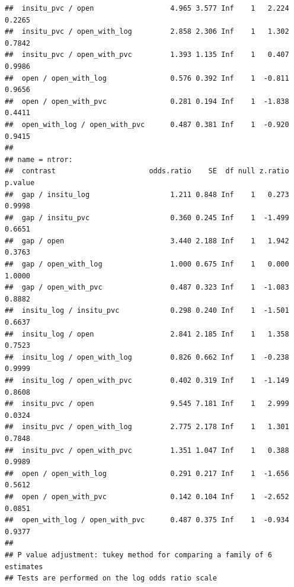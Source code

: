 \documentclass[
]{article}
\newenvironment{Shaded}{\begin{snugshade}}{\end{snugshade}}
\newcommand{\AttributeTok}[1]{\textcolor[rgb]{0.13,0.29,0.53}{#1}}
\newcommand{\ConstantTok}[1]{\textcolor[rgb]{0.56,0.35,0.01}{#1}}
\newcommand{\DecValTok}[1]{\textcolor[rgb]{0.00,0.00,0.81}{#1}}
\newcommand{\DocumentationTok}[1]{\textcolor[rgb]{0.56,0.35,0.01}{\textbf{\textit{#1}}}}
\newcommand{\FunctionTok}[1]{\textcolor[rgb]{0.13,0.29,0.53}{\textbf{#1}}}
\newcommand{\NormalTok}[1]{#1}
\newcommand{\OtherTok}[1]{\textcolor[rgb]{0.56,0.35,0.01}{#1}}
\newcommand{\SpecialCharTok}[1]{\textcolor[rgb]{0.81,0.36,0.00}{\textbf{#1}}}
\newcommand{\StringTok}[1]{\textcolor[rgb]{0.31,0.60,0.02}{#1}}
\begin{document}
\begin{verbatim}
##  insitu_pvc / open                  4.965 3.577 Inf    1   2.224  0.2265
##  insitu_pvc / open_with_log         2.858 2.306 Inf    1   1.302  0.7842
##  insitu_pvc / open_with_pvc         1.393 1.135 Inf    1   0.407  0.9986
##  open / open_with_log               0.576 0.392 Inf    1  -0.811  0.9656
##  open / open_with_pvc               0.281 0.194 Inf    1  -1.838  0.4411
##  open_with_log / open_with_pvc      0.487 0.381 Inf    1  -0.920  0.9415
## 
## name = ntror:
##  contrast                      odds.ratio    SE  df null z.ratio p.value
##  gap / insitu_log                   1.211 0.848 Inf    1   0.273  0.9998
##  gap / insitu_pvc                   0.360 0.245 Inf    1  -1.499  0.6651
##  gap / open                         3.440 2.188 Inf    1   1.942  0.3763
##  gap / open_with_log                1.000 0.675 Inf    1   0.000  1.0000
##  gap / open_with_pvc                0.487 0.323 Inf    1  -1.083  0.8882
##  insitu_log / insitu_pvc            0.298 0.240 Inf    1  -1.501  0.6637
##  insitu_log / open                  2.841 2.185 Inf    1   1.358  0.7523
##  insitu_log / open_with_log         0.826 0.662 Inf    1  -0.238  0.9999
##  insitu_log / open_with_pvc         0.402 0.319 Inf    1  -1.149  0.8608
##  insitu_pvc / open                  9.545 7.181 Inf    1   2.999  0.0324
##  insitu_pvc / open_with_log         2.775 2.178 Inf    1   1.301  0.7848
##  insitu_pvc / open_with_pvc         1.351 1.047 Inf    1   0.388  0.9989
##  open / open_with_log               0.291 0.217 Inf    1  -1.656  0.5612
##  open / open_with_pvc               0.142 0.104 Inf    1  -2.652  0.0851
##  open_with_log / open_with_pvc      0.487 0.375 Inf    1  -0.934  0.9377
## 
## P value adjustment: tukey method for comparing a family of 6 estimates 
## Tests are performed on the log odds ratio scale
\end{verbatim}

\begin{Shaded}
\end{Shaded}
\end{document}
